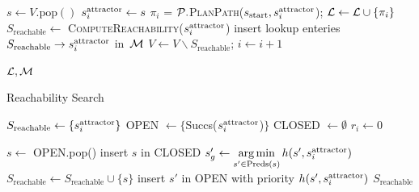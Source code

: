 \documentclass[a4paper,10pt]{article}
\begin{document}
{\begin{algorithm}[t]
\begin{algorithmic}[1]
  \vspace{2mm}
          \State $s \leftarrow V.\text{pop}()$ %
        \State $s^{\text{attractor}}_i \leftarrow s$               
                \State $\pi_i$ = $\mathcal{P}.$\textsc{PlanPath}($s_{\textrm{start}}, s^{\text{attractor}}_i$); %
                \hspace{2mm }
                $\mathcal{L} \leftarrow \mathcal{L} \cup \{ \pi_i \}$  %
                \State $S_{\text{reachable}} \leftarrow$ \textsc{ComputeReachability}($s^{\text{attractor}}_i$) %
                \State insert lookup enteries $S_{\text{reachable}} \rightarrow s^{\text{attractor}}_i$ in~$\mathcal{M}$
                \State $V \leftarrow V \backslash S_{\text{reachable}}$;
                \hspace{2mm} $ i \leftarrow i+1$

        \EndWhile

  \vspace{2mm}

  \State \Return $\mathcal{L}, \mathcal{M}$
\EndProcedure
\end{algorithmic}
\end{algorithm}

\begin{algorithm}[t]
\caption{Reachability Search}\label{alg:reach2}

\begin{algorithmic}[1]
\State $S_{\text{reachable}} \leftarrow \{s^{\text{attractor}}_i\}$  %
\State OPEN $\leftarrow \{$Succs($s^{\text{attractor}}_i$)$\}$  %
\State CLOSED $\leftarrow \emptyset$
\State $r_i \leftarrow 0$

    \State $s \leftarrow$ OPEN.pop()
    \State insert $s$ in CLOSED
    \State $s'_g \leftarrow \operatorname*{arg\,min}\limits_{s' \in \text{Preds}(s)} h(s', s^{\text{attractor}}_i)$ 
        \State $S_{\text{reachable}} \leftarrow S_{\text{reachable}} \cup \{s\}$  %
    \EndIf
            \State insert $s'$ in OPEN with priority $h(s', s^{\text{attractor}}_i)$
        \EndIf
    \EndFor
\EndWhile
\State \Return $S_{\text{reachable}}$


\end{algorithmic}
\end{algorithm}}
\end{document}
